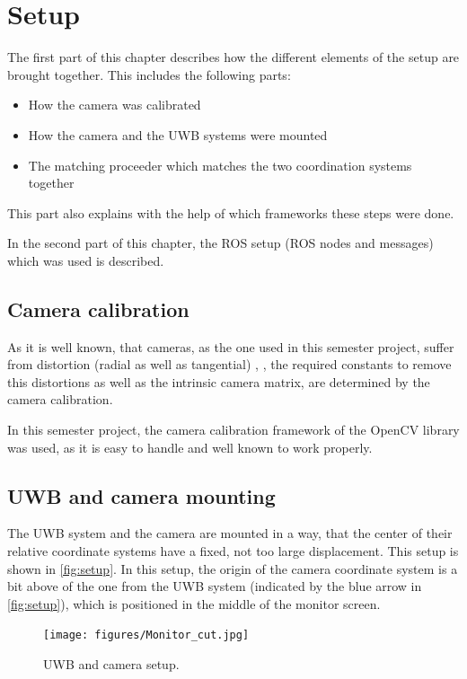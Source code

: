 
\setcounter{chapter}{2}

\chapter{Setup}\label{ch:setup}
The first part of this chapter describes how the different elements of the setup are brought together. This includes the following parts:
\begin{itemize}
	\item How the camera was calibrated
	\item How the camera and the UWB systems were mounted
	\item The matching proceeder which matches the two coordination systems together
\end{itemize}
This part also explains with the help of which frameworks these steps were done.

In the second part of this chapter, the ROS setup (ROS nodes and messages) which was used is described. 

\section{Camera calibration}
As it is well known, that cameras, as the one used in this semester project, suffer from distortion (radial as well as tangential) \cite{Szeliski:2010:CVA:1941882}, \cite{opencv_library}, the required constants to remove this distortions as well as the intrinsic camera matrix, are determined by the camera calibration.

In this semester project, the camera calibration framework of the OpenCV library \cite{opencv_library} was used, as it is easy to handle and well known to work properly.

\section{UWB and camera mounting}
The UWB system and the camera are mounted in a way, that the center of their relative coordinate systems have a fixed, not too large displacement. This setup is shown in \autoref{fig:setup}. In this setup, the origin of the camera coordinate system is a bit above of the one from the UWB system (indicated by the blue arrow in \autoref{fig:setup}), which is positioned in the middle of the monitor screen. 

\begin{figure}[h]\centering
	\texttt{[image: figures/Monitor\_cut.jpg]}
	\caption{UWB and camera setup.}\label{fig:setup}
\end{figure}

